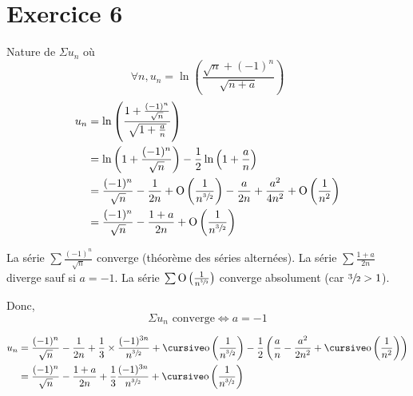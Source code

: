 \part{Exercice 6}

Nature de $\Sigma u_n$ où \[
	\forall n, u_n = \ln\left( \frac{\sqrt{n} + (-1)^{n}}{\sqrt{n+a}} \right)
\]
\begin{align*}
	u_n &= \ln\left( \frac{1+\frac{(-1)^n}{\sqrt{n}}}{\sqrt{1+\frac{a}{n}}} \right)\\
	&= \ln\left( 1+ \frac{(-1)^n}{\sqrt{n}} \right) - \frac{1}{2}\ln\left( 1+\frac{a}{n} \right) \\
	&= \frac{(-1)^n}{\sqrt{n}} - \frac{1}{2n} + \operatorname*{O}\left( \frac{1}{n^{\sfrac{3}{2}}} \right) - \frac{a}{2n} + \frac{a^2}{4n^2} + \operatorname*{O}\left( \frac{1}{n^2} \right)\\
	&= \frac{(-1)^n}{\sqrt{n}} - \frac{1+a}{2n} + \operatorname*{O}\left( \frac{1}{n^{\sfrac{3}{2}}} \right) \\
\end{align*}

La série $\sum \frac{(-1)^n}{\sqrt{n}}$ converge (théorème des séries alternées). La série $\sum \frac{1+a}{2n}$ diverge sauf si $a = -1$. La série $\sum \operatorname*{O}\left( \frac{1}{n^{\sfrac{3}{2}}} \right)$ converge absolument (car $\sfrac{3}{2} > 1$).

Donc, \[
	\Sigma u_n \text{ converge} \iff a = -1
\]

\begin{align*}
	u_n &= \frac{(-1)^n}{\sqrt{n}} - \frac{1}{2n} + \frac{1}{3} \times \frac{(-1)^{3n}}{n^{\sfrac{3}{2}}} + \po\left( \frac{1}{n^{\sfrac{3}{2}}} \right) - \frac{1}{2}\left( \frac{a}{n} - \frac{a^2}{2n^2} + \po\left( \frac{1}{n^2} \right) \right)\\
	&= \frac{(-1)^n}{\sqrt{n}} - \frac{1+a}{2n} + \frac{1}{3} \frac{(-1)^{3n}}{n^{\sfrac{3}{2}}} + \po\left( \frac{1}{n^{\sfrac{3}{2}}} \right) \\
\end{align*}

